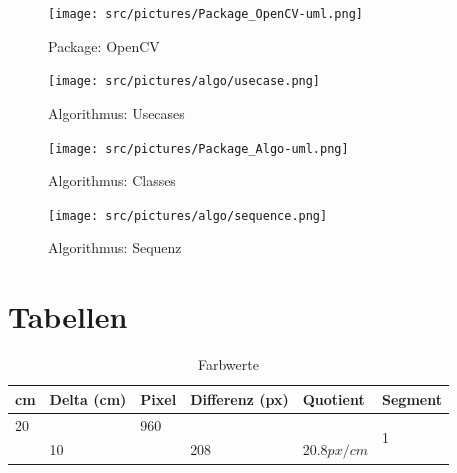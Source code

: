 \begin{appendix}
        \begin{figure}[ht]
            \centering
            \texttt{[image: src/pictures/Package\_OpenCV-uml.png]}
            \caption{Package: OpenCV}
            \label{img:package:ocv}
        \end{figure}

        \cleardoubleemptypage

        \begin{figure}[ht]
            \centering
            \texttt{[image: src/pictures/algo/usecase.png]}
            \caption{Algorithmus: Usecases}
            \label{img:algo:usecases}
        \end{figure}

        \cleardoubleemptypage

        \begin{figure}[ht]
            \centering
            \texttt{[image: src/pictures/Package\_Algo-uml.png]}
            \caption{Algorithmus: Classes}
            \label{img:algo:classes}
        \end{figure}

        \cleardoubleemptypage

        \begin{figure}[ht]
            \centering
            \texttt{[image: src/pictures/algo/sequence.png]}
            \caption{Algorithmus: Sequenz}
            \label{img:algo:sequence}
        \end{figure}

    \chapter{Tabellen}

        \begin{table}[h]
            \caption{Farbwerte}
            \label{tbl:cmtbl}
            \begin{center}
                \begin{tabular}[]{| l | l | l | l | l | l |}
                    \hline
                    cm      & Delta (cm) & Pixel & Differenz (px) & Quotient     & Segment \\

                    \hline

                    20      &            & 960   &                &              & \multirow{2}{1cm}{1} \\
                            & 10         &       & 208            & $20.8 px/cm$ & \\
                    \hline


\end{tabular}
\end{center}
\end{table}
\end{appendix}
